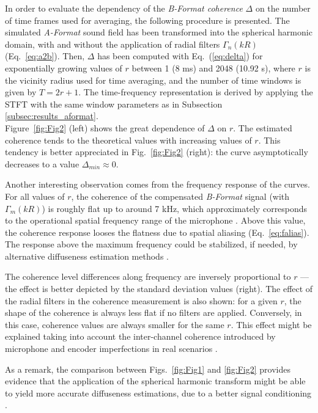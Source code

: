 In order to evaluate the dependency of the \textit{B-Format coherence} $\Delta$ on the number of time frames used for averaging, the following procedure is presented.
The simulated \textit{A-Format} sound field has been transformed into the spherical harmonic domain, with and without the application of radial filters $\Gamma_n(kR)$ (Eq.~\ref{eq:a2b}). Then, $\Delta$ has been computed with Eq.~(\ref{eq:delta}) for exponentially growing values of $r$ between 1 (8 ms) and 2048 (10.92 s), where $r$ is the vicinity radius used for time averaging, and the number of time windows is given by $T = 2r+1$.
The time-frequency representation is derived by applying the STFT with the same window parameters as in Subsection \ref{subsec:results_aformat}.\\

Figure~\ref{fig:Fig2} (left) shows the great dependence of $\Delta$ on $r$.  The estimated coherence tends to the theoretical values with increasing values of $r$. This tendency is better appreciated in Fig.~\ref{fig:Fig2} (right): the curve asymptotically decreases to a value $\Delta_{min}\approx0$.

Another interesting observation comes from the frequency response of the curves. For all values of $r$, the coherence of the compensated \textit{B-Format} signal (with $\Gamma_m(kR)$) is roughly flat up to around 7 kHz, which approximately corresponds to the operational spatial frequency range of the microphone \cite{gerzon_design_1975}.
Above this value, the coherence response looses the flatness due to spatial aliasing (Eq.~\ref{eq:falias}). The response above the maximum frequency could be stabilized, if needed, by alternative diffuseness estimation methods \cite{politis_direction--arrival_2015}.

The coherence level differences along frequency are inversely proportional to $r$ --- the effect is better depicted by the standard deviation values (right).
The effect of the radial filters in the coherence measurement is also shown: for a given $r$, the shape of the coherence is always less flat if no filters are applied. Conversely, in this case, coherence values are always smaller for the same $r$. This effect might be explained taking into account the inter-channel coherence introduced by microphone and encoder imperfections in real scenarios \cite{schorkhuber_ambisonic_2017}.

As a remark, the comparison between Figs.~\ref{fig:Fig1} and \ref{fig:Fig2} provides evidence that the application of the spherical harmonic transform might be able to yield more accurate diffuseness estimations, due to a better signal conditioning \cite{epain_spherical_2016}.\\



